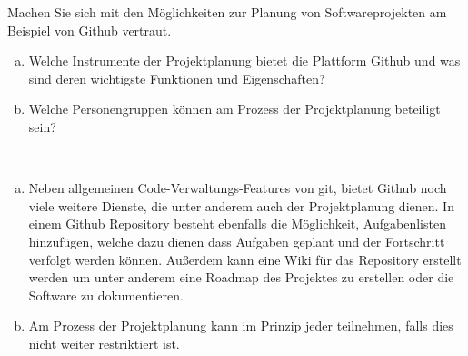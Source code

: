     
    
        \begin{aufgabe}
            Machen Sie sich mit den Möglichkeiten zur Planung von Softwareprojekten am Beispiel von Github vertraut.
            \\[-.7cm]\begin{enumerate}[(a)]
                \setlength\itemsep{0.1px}
                \item  Welche Instrumente der Projektplanung bietet die Plattform Github und was sind
                deren wichtigste Funktionen und Eigenschaften?
                \item Welche Personengruppen können am Prozess der Projektplanung beteiligt sein?

            \end{enumerate}
        \end{aufgabe}
    
        \begin{loesung}\:
            \\[-.7cm]\begin{enumerate}[(a)]
                \setlength\itemsep{0.1px}
                \item Neben allgemeinen Code-Verwaltungs-Features von git, bietet Github noch viele weitere Dienste, die unter anderem auch der Projektplanung dienen. In einem Github Repository besteht ebenfalls die Möglichkeit, Aufgabenlisten hinzufügen, welche dazu dienen dass Aufgaben geplant und der Fortschritt verfolgt werden können. Außerdem kann eine Wiki für das Repository erstellt werden um unter anderem eine Roadmap des Projektes zu erstellen oder die Software zu dokumentieren.
                \item Am Prozess der Projektplanung kann im Prinzip jeder teilnehmen, falls dies nicht weiter restriktiert ist.
            \end{enumerate}
        \end{loesung}
	
    
    
